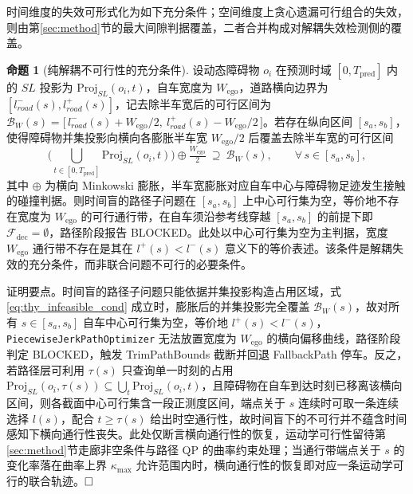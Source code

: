\documentclass[a4paper,zihao=5]{ctexart}
\theoremstyle{definition}
\newtheorem{proposition}{命题}[section]
\begin{document}
时间维度的失效可形式化为如下充分条件；空间维度上贪心遗漏可行组合的失效，则由第\ref{sec:method}节的最大间隙判据覆盖，二者合并构成对解耦失效检测侧的覆盖。

\begin{proposition}[纯解耦不可行性的充分条件]
\label{prop:decoupled_infeasible}
设动态障碍物 $o_i$ 在预测时域 $[0, T_{\text{pred}}]$ 内的 $SL$ 投影为 $\mathrm{Proj}_{SL}(o_i, t)$，自车宽度为 $W_{\text{ego}}$，道路横向边界为 $[l_{road}^{-}(s), l_{road}^{+}(s)]$，记去除半车宽后的可行区间为 $\mathcal{B}_{W}(s) = \bigl[\, l_{road}^{-}(s) + W_{\text{ego}}/2,\ l_{road}^{+}(s) - W_{\text{ego}}/2 \,\bigr]$。若存在纵向区间 $[s_a, s_b]$，使得障碍物并集投影向横向各膨胀半车宽 $W_{\text{ego}}/2$ 后覆盖去除半车宽的可行区间
\begin{equation}
    \Big(\bigcup_{t \in [0, T_{\text{pred}}]} \mathrm{Proj}_{SL}(o_i, t)\Big) \oplus \tfrac{W_{\text{ego}}}{2}\ \supseteq\ \mathcal{B}_{W}(s), \qquad \forall\, s \in [s_a, s_b],
    \label{eq:thy_infeasible_cond}
\end{equation}
其中 $\oplus$ 为横向 Minkowski 膨胀，半车宽膨胀对应自车中心与障碍物足迹发生接触的碰撞判据。则时间盲的路径子问题在 $[s_a, s_b]$ 上中心可行集为空，等价地不存在宽度为 $W_{\text{ego}}$ 的可行通行带，在自车须沿参考线穿越 $[s_a, s_b]$ 的前提下即 $\mathcal{F}_{\text{dec}} = \emptyset$，路径阶段报告 BLOCKED。此处以中心可行集为空为主判据，宽度 $W_{\text{ego}}$ 通行带不存在是其在 $l^{+}(s) < l^{-}(s)$ 意义下的等价表述。该条件是解耦失效的充分条件，而非联合问题不可行的必要条件。
\end{proposition}

证明要点。时间盲的路径子问题只能依据并集投影构造占用区域，式 \eqref{eq:thy_infeasible_cond} 成立时，膨胀后的并集投影完全覆盖 $\mathcal{B}_{W}(s)$，故对所有 $s \in [s_a, s_b]$ 自车中心可行集为空，等价地 $l^{+}(s) < l^{-}(s)$，\texttt{PiecewiseJerkPathOptimizer} 无法放置宽度为 $W_{\text{ego}}$ 的横向偏移曲线，路径阶段判定 BLOCKED，触发 TrimPathBounds 截断并回退 FallbackPath 停车。反之，若路径层可利用 $\tau(s)$ 只查询单一时刻的占用 $\mathrm{Proj}_{SL}(o_i, \tau(s)) \subseteq \bigcup_t \mathrm{Proj}_{SL}(o_i, t)$，且障碍物在自车到达时刻已移离该横向区间，则各截面中心可行集含一段正测度区间，端点关于 $s$ 连续时可取一条连续选择 $l(s)$，配合 $t \geq \tau(s)$ 给出时空通行性，故时间盲下的不可行并不蕴含时间感知下横向通行性丧失。此处仅断言横向通行性的恢复，运动学可行性留待第\ref{sec:method}节走廊非空条件与路径 QP 的曲率约束处理；当通行带端点关于 $s$ 的变化率落在曲率上界 $\kappa_{\max}$ 允许范围内时，横向通行性的恢复即对应一条运动学可行的联合轨迹。$\hfill\Box$
\end{document}
